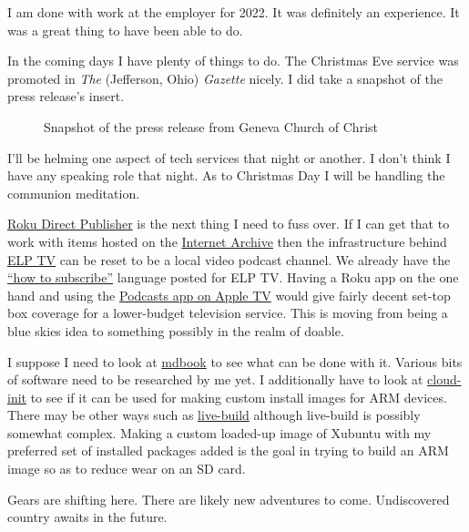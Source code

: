 I am done with work at the employer for 2022. It was definitely an
experience. It was a great thing to have been able to do.

In the coming days I have plenty of things to do. The Christmas Eve
service was promoted in \emph{The} (Jefferson, Ohio) \emph{Gazette}
nicely. I did take a snapshot of the press release's insert.

\begin{figure}
\centering
{}
\caption{Snapshot of the press release from Geneva Church of Christ}
\end{figure}

I'll be helming one aspect of tech services that night or another. I
don't think I have any speaking role that night. As to Christmas Day I
will be handling the communion meditation.

\href{https://developer.roku.com/docs/direct-publisher/overview.md}{Roku
Direct Publisher} is the next thing I need to fuss over. If I can get
that to work with items hosted on the
\href{https://archive.org/details/movies}{Internet Archive} then the
infrastructure behind \href{https://coyote.works/}{ELP TV} can be reset
to be a local video podcast channel. We already have the
\href{https://coyote.works/howtouse.html}{``how to subscribe''} language
posted for ELP TV. Having a Roku app on the one hand and using the
\href{https://web.archive.org/web/20221007010350/https://support.apple.com/en-ge/guide/tv/atvbb0659155/tvos}{Podcasts
app on Apple TV} would give fairly decent set-top box coverage for a
lower-budget television service. This is moving from being a blue skies
idea to something possibly in the realm of doable.

I suppose I need to look at
\href{https://rust-lang.github.io/mdBook/}{mdbook} to see what can be
done with it. Various bits of software need to be researched by me yet.
I additionally have to look at \href{https://cloud-init.io}{cloud-init}
to see if it can be used for making custom install images for ARM
devices. There may be other ways such as
\href{https://live-team.pages.debian.net/live-manual/html/live-manual/index.en.html}{live-build}
although live-build is possibly somewhat complex. Making a custom
loaded-up image of Xubuntu with my preferred set of installed packages
added is the goal in trying to build an ARM image so as to reduce wear
on an SD card.

Gears are shifting here. There are likely new adventures to come.
Undiscovered country awaits in the future.
